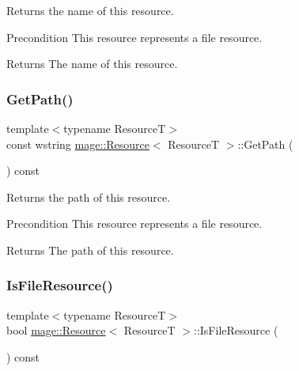 Returns the name of this resource.

\begin{DoxyPrecond}{Precondition}
This resource represents a file resource. 
\end{DoxyPrecond}
\begin{DoxyReturn}{Returns}
The name of this resource. 
\end{DoxyReturn}
\hypertarget{classmage_1_1_resource_a9df55cc00e0412b1435538e8107ee563}{}\label{classmage_1_1_resource_a9df55cc00e0412b1435538e8107ee563} 
\subsubsection{\texorpdfstring{Get\+Path()}{GetPath()}}
{\footnotesize\ttfamily template$<$typename ResourceT$>$ \\
const wstring \hyperlink{classmage_1_1_resource}{mage\+::\+Resource}$<$ ResourceT $>$\+::Get\+Path (\begin{DoxyParamCaption}{ }\end{DoxyParamCaption}) const\hspace{0.3cm}{\ttfamily [noexcept]}}

Returns the path of this resource.

\begin{DoxyPrecond}{Precondition}
This resource represents a file resource. 
\end{DoxyPrecond}
\begin{DoxyReturn}{Returns}
The path of this resource. 
\end{DoxyReturn}
\hypertarget{classmage_1_1_resource_a5995b6f8a2b0193a50255d082ae56af8}{}\label{classmage_1_1_resource_a5995b6f8a2b0193a50255d082ae56af8} 
\subsubsection{\texorpdfstring{Is\+File\+Resource()}{IsFileResource()}}
{\footnotesize\ttfamily template$<$typename ResourceT$>$ \\
bool \hyperlink{classmage_1_1_resource}{mage\+::\+Resource}$<$ ResourceT $>$\+::Is\+File\+Resource (\begin{DoxyParamCaption}{ }\end{DoxyParamCaption}) const\hspace{0.3cm}{\ttfamily [noexcept]}}

